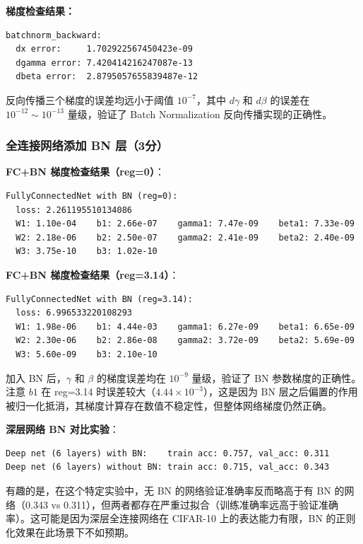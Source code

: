 \documentclass[a4paper]{article}
\begin{document}
\textbf{梯度检查结果：}

\begin{verbatim}
batchnorm_backward:
  dx error:     1.702922567450423e-09
  dgamma error: 7.420414216247087e-13
  dbeta error:  2.8795057655839487e-12
\end{verbatim}

反向传播三个梯度的误差均远小于阈值 $10^{-7}$，其中 $d\gamma$ 和 $d\beta$ 的误差在 $10^{-12} \sim 10^{-13}$ 量级，验证了 Batch Normalization 反向传播实现的正确性。

\subsubsection{全连接网络添加 BN 层（3分）}

\textbf{FC+BN 梯度检查结果（reg=0）}：

\begin{verbatim}
FullyConnectedNet with BN (reg=0):
  loss: 2.261195510134086
  W1: 1.10e-04    b1: 2.66e-07    gamma1: 7.47e-09    beta1: 7.33e-09
  W2: 2.18e-06    b2: 2.50e-07    gamma2: 2.41e-09    beta2: 2.40e-09
  W3: 3.75e-10    b3: 1.02e-10
\end{verbatim}

\textbf{FC+BN 梯度检查结果（reg=3.14）}：

\begin{verbatim}
FullyConnectedNet with BN (reg=3.14):
  loss: 6.996533220108293
  W1: 1.98e-06    b1: 4.44e-03    gamma1: 6.27e-09    beta1: 6.65e-09
  W2: 2.30e-06    b2: 2.86e-08    gamma2: 3.72e-09    beta2: 5.69e-09
  W3: 5.60e-09    b3: 2.10e-10
\end{verbatim}

加入 BN 后，$\gamma$ 和 $\beta$ 的梯度误差均在 $10^{-9}$ 量级，验证了 BN 参数梯度的正确性。注意 $b1$ 在 reg=3.14 时误差较大（$4.44 \times 10^{-3}$），这是因为 BN 层之后偏置的作用被归一化抵消，其梯度计算存在数值不稳定性，但整体网络梯度仍然正确。

\textbf{深层网络 BN 对比实验}：

\begin{verbatim}
Deep net (6 layers) with BN:    train acc: 0.757, val_acc: 0.311
Deep net (6 layers) without BN: train acc: 0.715, val_acc: 0.343
\end{verbatim}

有趣的是，在这个特定实验中，无 BN 的网络验证准确率反而略高于有 BN 的网络（0.343 vs 0.311），但两者都存在严重过拟合（训练准确率远高于验证准确率）。这可能是因为深层全连接网络在 CIFAR-10 上的表达能力有限，BN 的正则化效果在此场景下不如预期。
\end{document}
